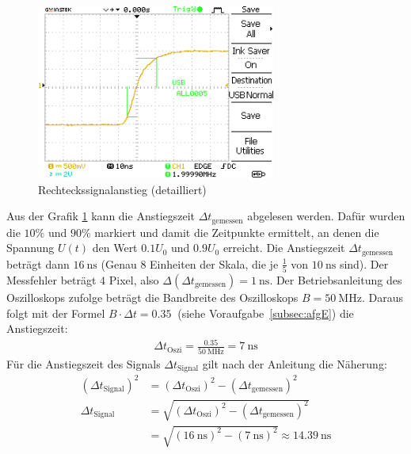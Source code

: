 \documentclass{article}
\begin{document}
\begin{enumerate}[label=\alph*]
         \begin{figure}[H]
             \centering
             \includegraphics[width=0.7\textwidth]{MesswerteVersuch0/A0005DS.png}
             \caption{Rechteckssignalanstieg (detailliert)}
             \label{fig:A0005DS}
         \end{figure}
         Aus der Grafik \ref{fig:A0005DS} kann die Anstiegszeit $\Delta t_\mathrm{gemessen}$ abgelesen werden. Dafür wurden die $10\%$ und $90\%$ markiert und damit die Zeitpunkte ermittelt, an denen die Spannung $U(t)$ den Wert $0.1 U_0$ und $0.9 U_0$ erreicht. Die Anstiegszeit $\Delta t_\mathrm{gemessen}$ beträgt dann $\SI{16}{\nano\second}$ (Genau $8$ Einheiten der Skala, die je $\frac{1}{5}$ von $\SI{10}{\nano\second}$ sind). Der Messfehler beträgt $4$ Pixel, also $\Delta(\Delta t_\mathrm{gemessen}) =  \SI{1}{\nano\second}$. Der Betriebsanleitung des Oszilloskops \cite{anleitung} zufolge beträgt die Bandbreite des Oszilloskops $B = \SI{50}{\mega\hertz}$. Daraus folgt mit der Formel $B \cdot \Delta t = \SI{0.35}{}$ (siehe Voraufgabe~\ref{subsec:afgE}) die Anstiegszeit:
         \begin{align*}
             \Delta t_\mathrm{Oszi} = \frac{0.35}{\SI{50}{\mega\hertz}} = \SI{7}{\nano\second}
         \end{align*}
         Für die Anstiegszeit des Signals $\Delta t_\mathrm{Signal}$ gilt nach der Anleitung\cite{anleitung} die Näherung:
         \begin{align*}
             (\Delta t_\mathrm{Signal})^2 &= (\Delta t_\mathrm{Oszi})^2 - (\Delta t_\mathrm{gemessen})^2 \\
             \Delta t_\mathrm{Signal} &= \sqrt{(\Delta t_\mathrm{Oszi})^2 - (\Delta t_\mathrm{gemessen})^2} \\
             &= \sqrt{(\SI{16}{\nano\second})^2 - (\SI{7}{\nano\second})^2} \approx \SI{14.39}{\nano\second}
         \end{align*}

\end{enumerate}
\end{document}
